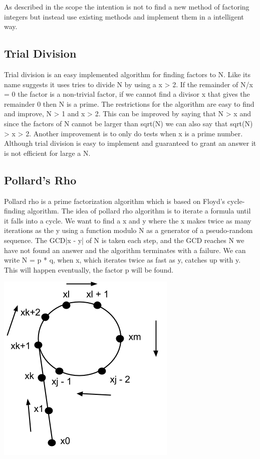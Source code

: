 As described in the scope the intention is not to find a new method of factoring integers but instead use existing methods and implement them in a intelligent way.

\subsection{Trial Division}
Trial division is an easy implemented algorithm for finding factors to N. Like its name suggests it uses tries to divide N by using a x > 2. If the remainder of N/x = 0 the factor is a non-trivial factor, if we cannot find a divisor x that gives the remainder 0 then N is a prime.
The restrictions for the algorithm are easy to find and improve, N > 1 and x > 2. This can be improved by saying that N > x and since the factors of N cannot be larger than sqrt(N) we can also say that sqrt(N) > x > 2. Another improvement is to only do tests when x is a prime number. Although trial division is easy to implement and guaranteed to grant an answer it is not efficient for large a N.

\subsection{Pollard's Rho}
Pollard rho is a prime factorization algorithm which is based on Floyd’s cycle-finding algorithm. The idea of pollard rho algorithm is to iterate a formula until it falls into a cycle. We want to find a x and y where the x makes twice as many iterations as the y using a function modulo N as a generator of a pseudo-random sequence. The GCD|x - y| of N is taken each step, and the GCD reaches N we have not found an answer and the algorithm terminates with a failure.
We can write N = p * q, when x, which iterates twice as fast as y, catches up with y. This will happen eventually, the factor p will be found.

\includegraphics[scale = 0.5]{pollards.png}